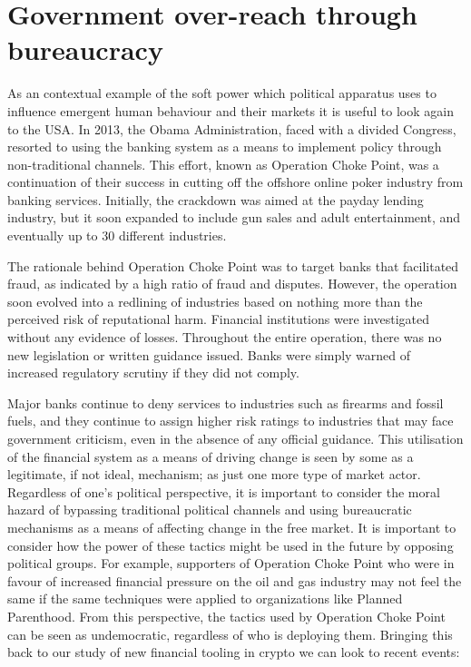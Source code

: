 \section{Government over-reach through bureaucracy}
As an contextual example of the soft power which political apparatus uses to influence emergent human behaviour and their markets it is useful to look again to the USA. In 2013, the Obama Administration, faced with a divided Congress, resorted to using the banking system as a means to implement policy through non-traditional channels. This effort, known as Operation Choke Point, was a continuation of their success in cutting off the offshore online poker industry from banking services. Initially, the crackdown was aimed at the payday lending industry, but it soon expanded to include gun sales and adult entertainment, and eventually up to 30 different industries.\par
The rationale behind Operation Choke Point was to target banks that facilitated fraud, as indicated by a high ratio of fraud and disputes. However, the operation soon evolved into a redlining of industries based on nothing more than the perceived risk of reputational harm. Financial institutions were investigated without any evidence of losses. Throughout the entire operation, there was no new legislation or written guidance issued. Banks were simply warned of increased regulatory scrutiny if they did not comply.\par
Major banks continue to deny services to industries such as firearms and fossil fuels, and they continue to assign higher risk ratings to industries that may face government criticism, even in the absence of any official guidance. This utilisation of the financial system as a means of driving change is seen by some as a legitimate, if not ideal, mechanism; as just one more type of market actor. Regardless of one's political perspective, it is important to consider the moral hazard of bypassing traditional political channels and using bureaucratic mechanisms as a means of affecting change in the free market. It is important to consider how the power of these tactics might be used in the future by opposing political groups. For example, supporters of Operation Choke Point who were in favour of increased financial pressure on the oil and gas industry may not feel the same if the same techniques were applied to organizations like Planned Parenthood. From this perspective, the tactics used by Operation Choke Point can be seen as undemocratic, regardless of who is deploying them. Bringing this back to our study of new financial tooling in crypto we can look to recent events:

